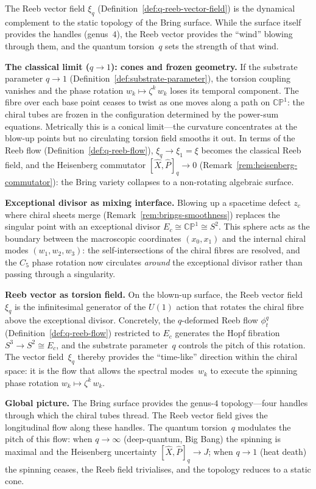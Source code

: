 \begin{remark}
\label{rem:reeb-exceptional-divisor}
The Reeb vector field $\xi_q$
(Definition~\ref{def:q-reeb-vector-field}) is the dynamical
complement to the static topology of the Bring surface.  While the
surface itself provides the handles (genus~$4$), the Reeb vector
provides the ``wind'' blowing through them, and the quantum torsion~$q$
sets the strength of that wind.

\medskip
\noindent\textbf{The classical limit ($q\to 1$): cones and frozen geometry.}\;
If the substrate parameter $q\to 1$
(Definition~\ref{def:substrate-parameter}), the
torsion coupling vanishes and the phase rotation
$w_k\mapsto\zeta^k\,w_k$ loses its temporal component.  The fibre
over each base point ceases to twist as one moves along a path on
$\mathbb{CP}^1$: the chiral tubes are frozen in the configuration
determined by the power-sum equations.  Metrically this is a conical
limit---the curvature concentrates at the blow-up points but no
circulating torsion field smooths it out.  In terms of the Reeb
flow (Definition~\ref{def:q-reeb-flow}), $\xi_q\to\xi_1=\xi$ becomes
the classical Reeb field, and the Heisenberg commutator
$[\hat{X},\hat{P}]_q\to 0$
(Remark~\ref{rem:heisenberg-commutator}): the Bring variety
collapses to a non-rotating algebraic surface.

\medskip
\noindent\textbf{Exceptional divisor as mixing interface.}\;
Blowing up a spacetime defect $z_c$ where chiral sheets merge
(Remark~\ref{rem:brings-smoothness}) replaces the singular point with
an exceptional divisor $E_c\cong\mathbb{CP}^1\cong S^2$.  This
sphere acts as the boundary between the macroscopic coordinates
$(x_0,x_1)$ and the internal chiral modes $(w_1,w_2,w_3)$: the
self-intersections of the chiral fibres are resolved, and the
$C_5$ phase rotation now circulates \emph{around} the exceptional
divisor rather than passing through a singularity.

\medskip
\noindent\textbf{Reeb vector as torsion field.}\;
On the blown-up surface, the Reeb vector field~$\xi_q$ is the
infinitesimal generator of the $U(1)$ action that rotates the chiral
fibre above the exceptional divisor.  Concretely, the
$q$-deformed Reeb flow $\phi_t^q$
(Definition~\ref{def:q-reeb-flow}) restricted to $E_c$ generates
the Hopf fibration $S^3\to S^2\cong E_c$, and the substrate
parameter~$q$ controls the pitch of this rotation.  The vector
field~$\xi_q$ thereby provides the ``time-like'' direction within the
chiral space: it is the flow that allows the spectral modes~$w_k$ to
execute the spinning phase rotation
$w_k\mapsto\zeta^k\,w_k$.

\medskip
\noindent\textbf{Global picture.}\;
The Bring surface provides the genus-$4$ topology---four handles
through which the chiral tubes thread.  The Reeb vector field gives
the longitudinal flow along these handles.  The quantum torsion~$q$
modulates the pitch of this flow: when $q\to\infty$ (deep-quantum,
Big Bang) the spinning is maximal and the Heisenberg uncertainty
$[\hat{X},\hat{P}]_q\to J$; when $q\to 1$ (heat death) the spinning
ceases, the Reeb field trivialises, and the topology reduces to a
static cone.
\end{remark}


